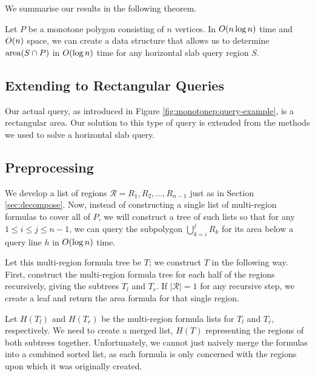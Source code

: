  
We summarise our results in the following theorem.

\begin{theorem}
\label{th:montonep:slab-area}
Let $P$ be a monotone polygon consisting of $n$ vertices. In $O\!\left(n \log{n}\right)$ 
time and $O\!\left(n\right)$ space, we can create a data structure that allows us to 
determine $\operatorname{area}\!\left(S \cap P\right)$ in $O\!\left(\log{n}\right)$ time for any horizontal slab 
query region $S$.
\end{theorem}



\subsection{Extending to Rectangular Queries}
\label{:monotonep:rect}

Our actual query, as introduced in Figure \ref{fig:monotonep:query-example}, is 
a rectangular area. Our solution to this type of query is extended from the 
methods we used to solve a horizontal slab query.

\subsection{Preprocessing}
\label{:monotonep:rect:pre}

We develop a list of regions $\mathcal{R} = R_1, R_2, \ldots, R_{n-1}$ just as 
in Section \ref{sec:decompose}.  Now, instead of constructing a single list of 
multi-region formulas to cover all of $P$, we will construct a tree of such 
lists so that for any $1 \leq i \leq j \leq n-1$, we can query the subpolygon 
$\bigcup_{k=i}^{j}{R_k}$ for its area below a query line $h$ in 
$O\!\left(\log{n}\right)$ time.

Let this multi-region formula tree be $T$; we construct $T$ in the following 
way. First, construct the multi-region formula tree for each half of the regions 
recursively, giving the subtrees $T_l$ and $T_r$. If $|\mathcal{R}| = 1$ for any 
recursive step, we create a leaf and return the area formula for that single 
region.

Let $H(T_l)$ and $H(T_r)$ be the multi-region formula lists for $T_l$ and $T_r$, 
respectively. 
We need to create a merged list, $H(T)$ representing the regions of both 
subtrees together. 
Unfortunately, we cannot just naively merge the formulas into a combined sorted 
list, as each formula is only concerned with the regions upon which it was 
originally created. 

